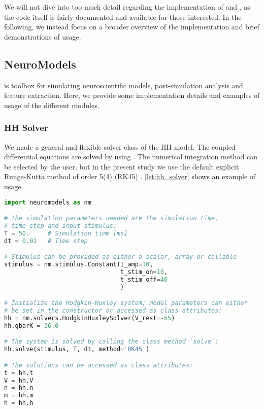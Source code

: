 We will not dive into too much detail regarding the implementation of  and , as the code itself is fairly documented and available for those interested. In the following, we instead focus on a broader overview of the implementation and brief demonstrations of usage.

\subsection{NeuroModels}\label{sec:neuromodels}

 is toolbox for simulating neuroscientific models, post-simulation analysis and feature extraction. Here, we provide some implementation details and examples of usage of the different modules. 

\subsubsection*{HH Solver}

We made a general and flexible solver class of the HH model. The coupled differential equations are solved by using . The numerical integration method can be selected by the user, but in the present study we use the default explicit Runge-Kutta method of order 5(4) (RK45) \cite{RK45}. \cref{lst:hh_solver} shows an example of usage.


\begin{lstlisting}[language=python, label={lst:hh_solver}, caption={Example usage of the HH solver.}]
import neuromodels as nm

# The simulation parameters needed are the simulation time,
# time step and input stimulus:
T = 50.     # Simulation time [ms]
dt = 0.01   # Time step 

# Stimulus can be provided as either a scalar, array or callable
stimulus = nm.stimulus.Constant(I_amp=10,
                                t_stim_on=10,
                                t_stim_off=40
                                )

# Initialize the Hodgkin-Huxley system; model parameters can either
# be set in the constructor or accessed as class attributes:
hh = nm.solvers.HodgkinHuxleySolver(V_rest=-65)
hh.gbarK = 36.0

# The system is solved by calling the class method `solve`:
hh.solve(stimulus, T, dt, method='RK45')

# The solutions can be accessed as class attributes:
t = hh.t
V = hh.V
n = hh.n
m = hh.m
h = hh.h
\end{lstlisting}

